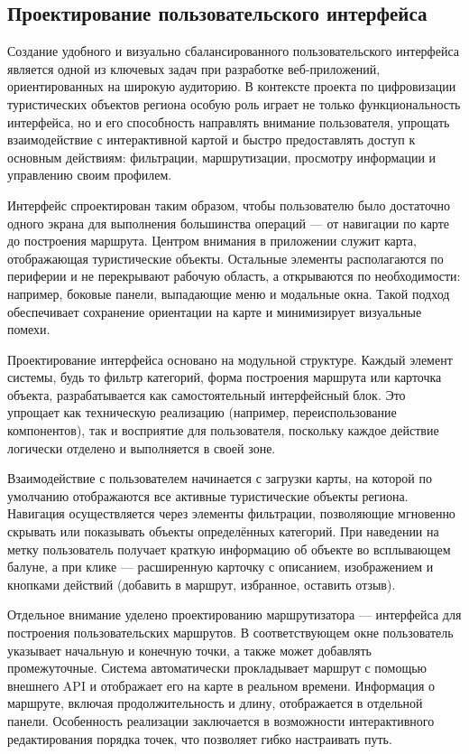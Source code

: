 \subsection{Проектирование пользовательского интерфейса}

Создание удобного и визуально сбалансированного пользовательского интерфейса\cite{b16} является одной из ключевых задач при разработке веб-приложений, ориентированных на широкую аудиторию. В контексте проекта по цифровизации туристических объектов региона особую роль играет не только функциональность интерфейса, но и его способность направлять внимание пользователя, упрощать взаимодействие с интерактивной картой и быстро предоставлять доступ к основным действиям: фильтрации, маршрутизации, просмотру информации и управлению своим профилем.

Интерфейс спроектирован таким образом, чтобы пользователю было достаточно одного экрана для выполнения большинства операций — от навигации по карте до построения маршрута. Центром внимания в приложении служит карта, отображающая туристические объекты. Остальные элементы располагаются по периферии и не перекрывают рабочую область, а открываются по необходимости: например, боковые панели, выпадающие меню и модальные окна. Такой подход обеспечивает сохранение ориентации на карте и минимизирует визуальные помехи.

Проектирование интерфейса основано на модульной структуре. Каждый элемент системы, будь то фильтр категорий, форма построения маршрута или карточка объекта, разрабатывается как самостоятельный интерфейсный блок. Это упрощает как техническую реализацию (например, переиспользование компонентов), так и восприятие для пользователя, поскольку каждое действие логически отделено и выполняется в своей зоне.

Взаимодействие с пользователем начинается с загрузки карты, на которой по умолчанию отображаются все активные туристические объекты региона. Навигация осуществляется через элементы фильтрации, позволяющие мгновенно скрывать или показывать объекты определённых категорий. При наведении на метку пользователь получает краткую информацию об объекте во всплывающем балуне, а при клике — расширенную карточку с описанием, изображением и кнопками действий (добавить в маршрут, избранное, оставить отзыв).

Отдельное внимание уделено проектированию маршрутизатора — интерфейса для построения пользовательских маршрутов. В соответствующем окне пользователь указывает начальную и конечную точки, а также может добавлять промежуточные. Система автоматически прокладывает маршрут с помощью внешнего API\cite{b17} и отображает его на карте в реальном времени. Информация о маршруте, включая продолжительность и длину, отображается в отдельной панели. Особенность реализации заключается в возможности интерактивного редактирования порядка точек, что позволяет гибко настраивать путь.

